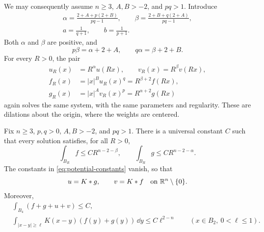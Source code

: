 We may consequently assume
$n\ge3$, $A,B>-2$, and $pq>1$.  Introduce
\begin{equation}\label{eq:parameters}
 \begin{gathered}
 \alpha=\frac{2+A+p(2+B)}{pq-1},\qquad
 \beta=\frac{2+B+q(2+A)}{pq-1},\\
 a=\frac1{q+1},\qquad b=\frac1{p+1}.
 \end{gathered}
\end{equation}
Both $\alpha$ and $\beta$ are positive, and
\[
 p\beta=\alpha+2+A,\qquad q\alpha=\beta+2+B.
\]
For every $R>0$, the pair
\begin{equation}\label{eq:scaling}
 \begin{split}
 u_R(x)&=R^\alpha u(Rx),\qquad v_R(x)=R^\beta v(Rx),\\
 f_R(x)&=|x|^B u_R(x)^q=R^{\beta+2}f(Rx),\\
 g_R(x)&=|x|^A v_R(x)^p=R^{\alpha+2}g(Rx)
 \end{split}
\end{equation}
again solves the same system, with the same parameters and regularity.
These are dilations about the origin, where the weights are centered.

\begin{proposition}\label{prop:uniform}
Fix $n\ge3$, $p,q>0$, $A,B>-2$, and $pq>1$.  There is a universal
constant $C$ such that every solution satisfies, for all $R>0$,
\begin{equation}\label{eq:source-bounds}
 \int_{B_R}f\le CR^{n-2-\beta},\qquad
 \int_{B_R}g\le CR^{n-2-\alpha}.
\end{equation}
The constants in \eqref{eq:potential-constants} vanish, so that
\begin{equation}\label{eq:potentials}
 u=K*g,\qquad v=K*f\quad\hbox{on }\mathbb R^n\setminus\{0\}.
\end{equation}
Moreover,
\begin{equation}\label{eq:uniform}
 \begin{split}
 &\int_{B_4}(f+g+u+v)\le C,\\
 &\int_{|x-y|\ge\ell}K(x-y)(f(y)+g(y))\,\dd y
       \le C\ell^{2-n}
       \qquad (x\in B_2,\ 0<\ell\le1).
 \end{split}
\end{equation}
\end{proposition}

